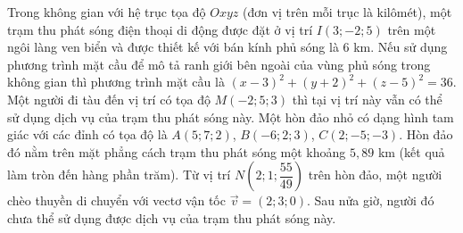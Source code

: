 \begin{ex}
Trong không gian với hệ trục tọa độ $Oxyz$ (đơn vị trên mỗi trục là kilômét), một trạm thu phát sóng điện thoại di động được đặt ở vị trí $I(3;-2;5)$ trên một ngôi làng ven biển và được thiết kế với bán kính phủ sóng là $6$ km.
\choiceTF
{\True Nếu sử dụng phương trình mặt cầu để mô tả ranh giới bên ngoài của vùng phủ sóng trong không gian thì phương trình mặt cầu là $(x-3)^2+(y+2)^2+(z-5)^2=36$.}
{Một người đi tàu đến vị trí có tọa độ $M(-2;5;3)$ thì tại vị trí này vẫn có thể sử dụng dịch vụ của trạm thu phát sóng này.}
{\True Một hòn đảo nhỏ có dạng hình tam giác với các đỉnh có tọa độ là $A(5;7;2)$, $B(-6;2;3)$, $C(2;-5;-3)$. Hòn đảo đó nằm trên mặt phẳng cách trạm thu phát sóng một khoảng $5{,}89$ km (kết quả làm tròn đến hàng phần trăm).}
{Từ vị trí $N\left(2;1;\dfrac{55}{49}\right)$ trên hòn đảo, một người chèo thuyền di chuyển với vectơ vận tốc $\vec v=(2;3;0)$. Sau nửa giờ, người đó chưa thể sử dụng được dịch vụ của trạm thu phát sóng này.}
\end{ex}
